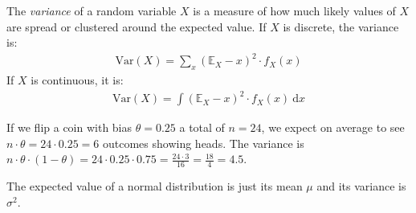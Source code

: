 \documentclass[nobib,nofonts]{tufte-handout}
\renewcommand{\markdef}[1]{\emph{#1}}
\newcommand{\mult}{\ensuremath{\cdot}}
\begin{document}
The \markdef{variance} of a random variable $X$ is a measure of how much likely values of $X$
are spread or clustered around the expected value. If $X$ is discrete, the variance is:
\begin{align*}
  \text{Var}(X) = \sum_x (\mathds{E}_X - x)^2 \mult f_X(x)
\end{align*}
If $X$ is continuous, it is:
\begin{align*}
  \text{Var}(X) = \int (\mathds{E}_X - x)^2 \mult f_X(x) \ \text{d}x
\end{align*}

\begin{example}
  If we flip a coin with bias $\theta = 0.25$ a total of $n=24$, we expect on average to see
  $n \mult \theta = 24 \mult 0.25 = 6$ outcomes showing heads. The variance is
  $n \mult \theta \mult (1-\theta) = 24 \mult 0.25 \mult 0.75 = \frac{24 \mult 3}{16} =
  \frac{18}{4} = 4.5$.

  The expected value of a normal distribution is just its mean $\mu$ and its variance is
  $\sigma^2$.
\end{example}

\end{document}
